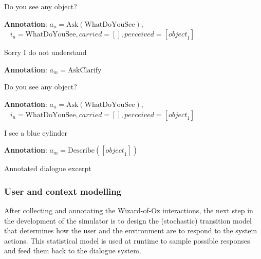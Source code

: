 \begin{Transcript}[p]
\begin{dialogue}
 Do you see any object? \\[1mm] 
\begin{footnotesize}\textbf{Annotation}: $a_u\!=\!\mathrm{Ask(WhatDoYouSee)},$\\ $\phantom{1}$ \hspace{16mm}$ i_u\!=\!\mathrm{WhatDoYouSee},\mathit{carried}\!=\![],\mathit{perceived}\!=\![\mathit{object}_1]$ \end{footnotesize} \vspace{2mm}
 Sorry I do not understand \\[1mm]
\begin{footnotesize}\textbf{Annotation}: $a_m\!=\!\mathrm{AskClarify}$ \end{footnotesize}\vspace{2mm}
 Do you see any object? \\[1mm]
\begin{footnotesize}\textbf{Annotation}: $a_u\!=\!\mathrm{Ask(WhatDoYouSee)}, $ \\ $\phantom{1}$ \hspace{16mm}$i_u\!=\! \mathrm{WhatDoYouSee}, \mathit{carried}\!=\![],\mathit{perceived}\!=\![\mathit{object}_1]$\end{footnotesize} \vspace{2mm}
 I see a blue cylinder \\[1mm]
\begin{footnotesize}\textbf{Annotation}: $a_m\!=\!\mathrm{Describe}([\mathit{object}_1])$ \end{footnotesize}
\end{dialogue}
\caption{Annotated dialogue excerpt}
\end{Transcript}


\subsubsection*{User and context modelling}

After collecting and annotating the Wizard-of-Oz interactions, the next step in the development of the simulator is to design the (stochastic) transition model that determines how the user and the environment are to respond to the system actions. This statistical model is used at runtime to sample possible responses and feed them back to the dialogue system. 

